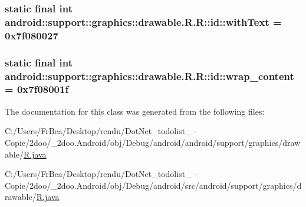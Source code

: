 \hypertarget{classandroid_1_1support_1_1graphics_1_1drawable_1_1_r_1_1id_f2da1c9a65ec68a9690f082d1d7062b5}{
\subsubsection[{withText}]{\setlength{\rightskip}{0pt plus 5cm}static final int android::support::graphics::drawable.R.R::id::withText = 0x7f080027}}
\label{classandroid_1_1support_1_1graphics_1_1drawable_1_1_r_1_1id_f2da1c9a65ec68a9690f082d1d7062b5}


\hypertarget{classandroid_1_1support_1_1graphics_1_1drawable_1_1_r_1_1id_c367459aeafa1976a6fbc626752b8121}{
\subsubsection[{wrap\_\-content}]{\setlength{\rightskip}{0pt plus 5cm}static final int android::support::graphics::drawable.R.R::id::wrap\_\-content = 0x7f08001f}}
\label{classandroid_1_1support_1_1graphics_1_1drawable_1_1_r_1_1id_c367459aeafa1976a6fbc626752b8121}




The documentation for this class was generated from the following files:\begin{CompactItemize}
\item 
C:/Users/FrBea/Desktop/rendu/DotNet\_\-todolist\_ - Copie/2doo/\_\-2doo.Android/obj/Debug/android/android/support/graphics/drawable/\hyperlink{android_2support_2graphics_2drawable_2_r_8java}{R.java}\item 
C:/Users/FrBea/Desktop/rendu/DotNet\_\-todolist\_ - Copie/2doo/\_\-2doo.Android/obj/Debug/android/src/android/support/graphics/drawable/\hyperlink{src_2android_2support_2graphics_2drawable_2_r_8java}{R.java}\end{CompactItemize}
